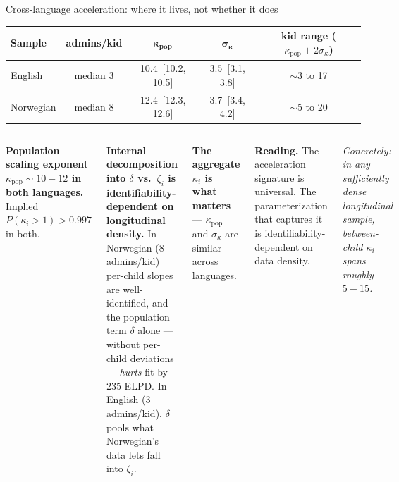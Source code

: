\documentclass[aspectratio=169,t]{beamer}
\renewcommand{\arraystretch}{1.10}
\begin{document}
\begin{frame}{Cross-language acceleration: where it lives, not whether it does}

\centering
\small
\renewcommand{\arraystretch}{1.20}
\begin{tabular}{@{}lcccc@{}}
\toprule
\textbf{Sample} & \textbf{admins/kid} & $\boldsymbol{\kappa_{\text{pop}}}$ & $\boldsymbol{\sigma_\kappa}$ & \textbf{kid range ($\kappa_{\text{pop}} \pm 2\sigma_\kappa$)} \\
\midrule
English   & median 3 & 10.4 \,[10.2, 10.5] & 3.5 \,[3.1, 3.8] & $\sim$3 to 17 \\
Norwegian & median 8 & 12.4 \,[12.3, 12.6] & 3.7 \,[3.4, 4.2] & $\sim$5 to 20 \\
\bottomrule
\end{tabular}

\vspace{0.8em}

\begin{columns}[T, onlytextwidth]
\textbf{Population scaling exponent $\kappa_{\text{pop}} \sim 10\!-\!12$
in both languages.} Implied $P(\kappa_i > 1) > 0.997$ in both.

\vspace{0.5em}
\textbf{Internal decomposition into $\delta$ vs.\ $\zeta_i$ is
identifiability-dependent on longitudinal density.} In Norwegian
(8 admins/kid) per-child slopes are well-identified, and the
population term $\delta$ alone --- without per-child deviations ---
\emph{hurts} fit by 235 ELPD. In English (3 admins/kid), $\delta$
pools what Norwegian's data lets fall into $\zeta_i$.

\vspace{0.5em}
\textbf{The aggregate $\kappa_i$ is what matters} --- $\kappa_{\text{pop}}$
and $\sigma_\kappa$ are similar across languages.

\textbf{Reading.} The acceleration signature is universal. The
parameterization that captures it is identifiability-dependent on
data density.

\vspace{0.5em}
\textit{Concretely: in any sufficiently dense longitudinal sample,
between-child $\kappa_i$ spans roughly $5\!-\!15$.}

\end{columns}

\end{frame}
\end{document}
